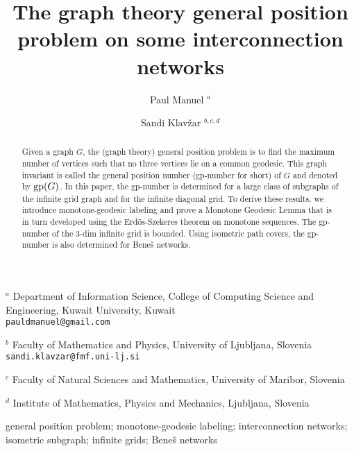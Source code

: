 \documentclass[12pt]{article}
\begin{document}
	
\title{The graph theory general position problem on some interconnection networks}
	
\author{
	Paul Manuel $^{a}$
	\and
	Sandi Klav\v zar $^{b,c,d}$
}

\date{}

\maketitle
\vspace{-0.8 cm}
\begin{center}
	$^a$ Department of Information Science, College of Computing Science and Engineering, Kuwait University, Kuwait \\
	{\tt pauldmanuel@gmail.com}\\
	\medskip
	
	$^b$ Faculty of Mathematics and Physics, University of Ljubljana, Slovenia\\
	{\tt sandi.klavzar@fmf.uni-lj.si}\\
	\medskip
	
	$^c$ Faculty of Natural Sciences and Mathematics, University of Maribor, Slovenia\\
	\medskip
	
	$^d$ Institute of Mathematics, Physics and Mechanics, Ljubljana, Slovenia\\
	
\end{center}

\begin{abstract}
Given a graph $G$, the (graph theory) general position problem is to find the maximum number of vertices such that no three vertices lie on a common geodesic. This graph invariant is called the general position number (gp-number for short)  of $G$ and denoted by ${\rm gp}(G)$. In this paper, the gp-number is determined for a large class of subgraphs of the infinite grid graph and for the infinite diagonal grid. To derive these results, we introduce monotone-geodesic labeling and prove a Monotone Geodesic Lemma that is in turn developed using the Erd\"os-Szekeres theorem on monotone sequences. The gp-number of the 3-dim infinite grid is bounded. Using isometric path covers, the gp-number is also determined for Bene\v{s} networks.
\end{abstract}

 general position problem; monotone-geodesic labeling; interconnection networks; isometric subgraph; infinite grids; Bene\v{s} networks
\end{document}
